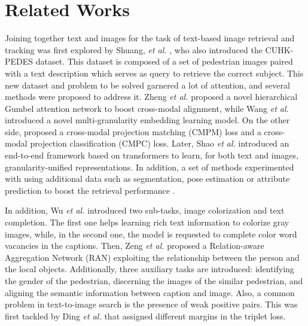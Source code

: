 \documentclass[acmsmall]{acmart}
\begin{document}
\section{Related Works}
Joining together text and images for the task of text-based image retrieval and tracking was first explored by Shuang, \textit{et al.} \cite{li2017person}, who also introduced the CUHK-PEDES dataset. This dataset is composed of a set of pedestrian images paired with a text description which serves as query to retrieve the correct subject. This new dataset and problem to be solved garnered a lot of attention, and several methods were proposed to address it. Zheng \textit{et al.} \cite{zheng2020hierarchical} proposed a novel hierarchical Gumbel attention network to boost cross-modal alignment, while Wang \textit{et al.} \cite{wang2021text} introduced a novel multi-granularity embedding learning model. On the other side, \cite{zhang2018deep} proposed a cross-modal projection matching (CMPM) loss and a cross-modal projection classification (CMPC) loss. Later, Shao \textit{et al.} \cite{shao2022learning} introduced an end-to-end framework based on transformers to learn, for both text and images, granularity-unified representations. In addition, a set of methods experimented with using additional data such as segmentation, pose estimation or attribute prediction to boost the retrieval performance \cite{wang2020vitaa,zhu2021dssl}. 


In addition, Wu \textit{et al.} \cite{wu2021lapscore} introduced two sub-tasks, image colorization and text completion. The first one helps learning rich text information to colorize gray images, while, in the second one, the model is requested to complete color word vacancies in the captions. Then, Zeng \textit{et al.} \cite{zeng2022relation} proposed a Relation-aware Aggregation Network (RAN) exploiting the relationship between the person and the local objects. Additionally, three auxiliary tasks are introduced: identifying the gender of the pedestrian, discerning the images of the similar pedestrian, and aligning the semantic information between caption and image. Also, a common problem in text-to-image search is the presence of weak positive pairs. This was first tackled by Ding \textit{et al.} \cite{ding2021semantically} that assigned different margins in the triplet loss.
\end{document}
